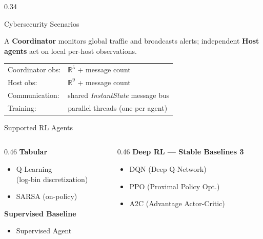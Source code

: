 \documentclass[final]{beamer}
\begin{document}
\begin{frame}[t]
\begin{columns}[T,totalwidth=\textwidth]
\begin{column}{0.34\textwidth}
\begin{block}{Cybersecurity Scenarios}
\begin{tcolorbox}[scenbox,
  title={Scenario 4 \textnormal{—} Multi-Agent Hierarchical (MARL)}]
\large
A \textbf{Coordinator} monitors global traffic and broadcasts alerts;
independent \textbf{Host agents} act on local per-host observations.\\[5pt]
\begin{tabular}{@{}ll@{}}
Coordinator obs: & $\mathbb{R}^{5}$ + message count \\
Host obs:        & $\mathbb{R}^{9}$ + message count \\
Communication:   & shared \textit{InstantState} message bus \\
Training:        & parallel threads (one per agent) \\
\end{tabular}
\end{tcolorbox}

\vspace{0.3cm}
\end{block}

\vspace{0.6cm}

\begin{block}{Supported RL Agents}
\large
\begin{columns}[T]
\begin{column}{0.46\textwidth}
\textbf{Tabular}
\begin{itemize}[leftmargin=1.2em,itemsep=2pt]
  \item Q-Learning\\\small(log-bin discretization)
  \item SARSA (on-policy)
\end{itemize}
\bigskip
\textbf{Supervised Baseline}
\begin{itemize}[leftmargin=1.2em,itemsep=2pt]
  \item Supervised Agent
\end{itemize}
\end{column}
\begin{column}{0.46\textwidth}
\textbf{Deep RL — Stable Baselines 3}
\begin{itemize}[leftmargin=1.2em,itemsep=2pt]
  \item DQN (Deep Q-Network)
  \item PPO (Proximal Policy Opt.)
  \item A2C (Advantage Actor-Critic)
\end{itemize}
\end{column}
\end{columns}
\end{block}


\end{column}
\end{columns}
\end{frame}
\end{document}
